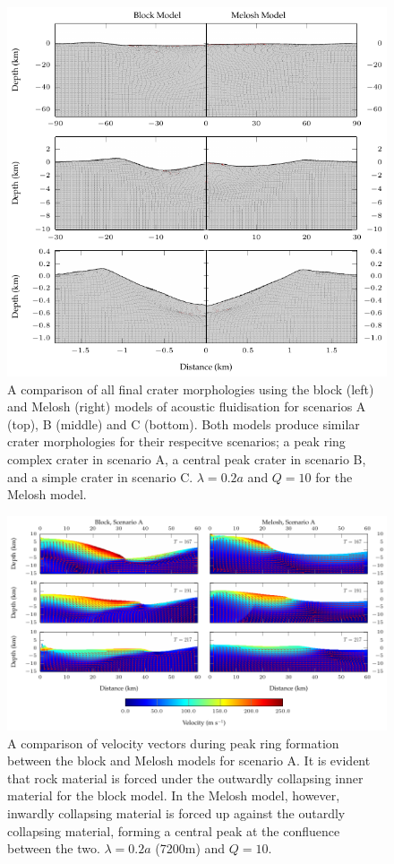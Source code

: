 \begin{figure}[!t]
\centering
\includegraphics[width=0.8\linewidth]{./images/comparison.pdf}
\caption{A comparison of all final crater morphologies using the block (left) and Melosh (right) models of acoustic fluidisation for scenarios A (top), B (middle) and C (bottom). Both models produce similar crater morphologies for their respecitve scenarios; a peak ring complex crater in scenario A, a central peak crater in scenario B, and a simple crater in scenario C. $\lambda=0.2a$ and $Q=10$ for the Melosh model. \label{fig:comparison}}
\end{figure}

\begin{figure}[!t]
\centering
\includegraphics[width=\linewidth]{./images/peak_ring.pdf}
\caption{A comparison of velocity vectors during peak ring formation between the block and Melosh models for scenario A. It is evident that rock material is forced under the outwardly collapsing inner material for the block model. In the Melosh model, however, inwardly collapsing material is forced up against the outardly collapsing material, forming a central peak at the confluence between the two. $\lambda=0.2a$ (7200m) and $Q=10$.\label{fig:peak_ring}}
\end{figure}

